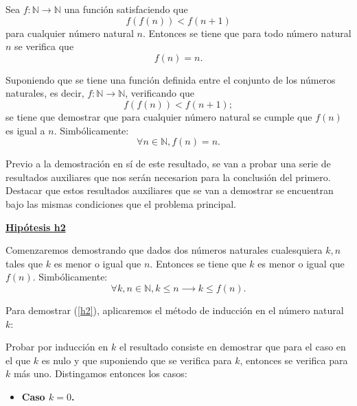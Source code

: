 \begin{teorema}[Extension]\label{extension}
  Sea \(f:ℕ → ℕ\) una función satisfaciendo que
  \begin{equation}
    f(f(n))<f(n+1)
  \end{equation}
  para cualquier número natural \(n\). Entonces se tiene que
  para todo número natural \(n\) se verifica que
  \begin{equation}
    f(n)=n.
  \end{equation}
\end{teorema}
\begin{demostracion}
  Suponiendo que se tiene una función definida entre el conjunto
  de los números naturales, es decir, \(f: ℕ → ℕ\), verificando
  que
  \begin{equation}\label{h1}\tag{h1}
     f(f(n))<f(n+1);
  \end{equation}
  se tiene que demostrar que para cualquier número natural se cumple
  que \(f(n)\) es igual a \(n\). Simbólicamente:
  \begin{equation}
    ∀ n∈ ℕ, f(n)=n.
  \end{equation}

  Previo a la demostración en sí de este resultado, se van a probar
  una serie de resultados auxiliares que nos serán necesarion para
  la conclusión del primero. Destacar que estos resultados auxiliares
  que se van a demostrar se encuentran bajo las mismas condiciones
  que el problema principal.
  
  \noindent
  \textbf{\underline{Hipótesis h2}}

  Comenzaremos demostrando que dados dos números naturales
  cualesquiera \(k,n\) tales que \(k\) es menor o igual que \(n\).
  Entonces se tiene que \(k\) es menor o igual que \(f(n)\).
  Simbólicamente:
  \begin{equation}\label{h2}\tag{h2}
    ∀ k, n ∈ ℕ, k≤ n ⟶ k ≤ f(n).
  \end{equation}

  Para demostrar (\ref{h2}), aplicaremos el método de inducción
  en el número natural \(k\):

  Probar por inducción en \(k\) el resultado consiste en demostrar
  que para el caso en el que \(k\) es nulo y que suponiendo que se
  verifica para \(k\), entonces se verifica para \(k\) más uno.
  Distingamos entonces los casos:
  
  \begin{itemize}
    \item \textbf{Caso \(k=0\).}


\end{itemize}
\end{demostracion}
